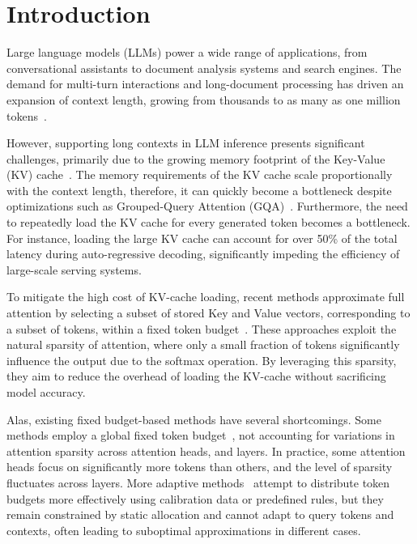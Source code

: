 \section{Introduction}
\label{sec:intro}



Large language models (LLMs) power a wide range of applications, from conversational assistants to document analysis systems and search engines. The demand for multi-turn interactions and long-document processing has driven an expansion of context length, growing from thousands to as many as one million tokens~\cite{liu2024scalinglawsropebasedextrapolation}.

However, supporting long contexts in LLM inference presents significant challenges, primarily due to the growing memory footprint of the Key-Value (KV) cache~\cite{tang2024questqueryawaresparsityefficient}. The memory requirements of the KV cache scale proportionally with the context length, therefore, it can quickly become a bottleneck despite optimizations such as Grouped-Query Attention (GQA)~\cite{ainslie2023gqa}. Furthermore, the need to repeatedly load the KV cache for every generated token becomes a bottleneck. For instance, loading the large KV cache can account for over 50\% of the total latency during auto-regressive decoding, significantly impeding the efficiency of large-scale serving systems.~\cite{tang2024questqueryawaresparsityefficient}









To mitigate the high cost of KV-cache loading, recent methods approximate full attention by selecting a subset of stored Key and Value vectors, corresponding to a subset of tokens, within a fixed token budget~\cite{liu2024clusterkvmanipulatingllmkv,tang2024questqueryawaresparsityefficient,zhang2023h2o,xiao2023streamingllm}. These approaches exploit the natural sparsity of attention, where only a small fraction of tokens significantly influence the output due to the softmax operation. By leveraging this sparsity, they aim to reduce the overhead of loading the KV-cache without sacrificing model accuracy.







Alas, existing fixed budget-based methods have several shortcomings. Some methods employ a global fixed token budget~\cite{tang2024questqueryawaresparsityefficient,xiao2023streamingllm,zhang2023h2o}, not accounting for variations in attention sparsity across attention heads, and layers. In practice, some attention heads focus on significantly more tokens than others, and the level of sparsity fluctuates across layers. More adaptive methods~\cite{cai2024pyramidkvdynamickvcache,feng2024adakvoptimizingkvcache,ge2024modeltellsdiscardadaptive} attempt to distribute token budgets more effectively using calibration data or predefined rules, but they remain constrained by static allocation and cannot adapt to query tokens and contexts, often leading to suboptimal approximations in different cases.





